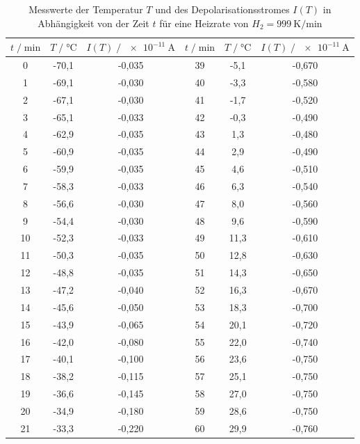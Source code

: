   \begin{table}
    \centering
    \caption{Messwerte der Temperatur $T$ und des Depolarisationsstromes $I(T)$ in Abhängigkeit von der Zeit $t$ für eine
    Heizrate von $H_2= \SI{999}{\kelvin\per\minute}$}
    \label{tab:mess2}
    \begin{tabular}{c c c c c c}
    \toprule
    $t \;/\; \si{\minute}$ & $T \;/\; \si{\celsius}$ & $I(T) \;/\; \SI{e-11}{\ampere}$ & 
    $t \;/\; \si{\minute}$ & $T \;/\; \si{\celsius}$ & $I(T) \;/\; \SI{e-11}{\ampere}$ \\
    \midrule
        0 & -70,1 & -0,035 & 39 & -5,1 & -0,670 \\
        1 & -69,1 & -0,030 & 40 & -3,3 & -0,580 \\
        2 & -67,1 & -0,030 & 41 & -1,7 & -0,520 \\
        3 & -65,1 & -0,033 & 42 & -0,3 & -0,490 \\
        4 & -62,9 & -0,035 & 43 &  1,3 & -0,480 \\
        5 & -60,9 & -0,035 & 44 &  2,9 & -0,490 \\
        6 & -59,9 & -0,035 & 45 &  4,6 & -0,510 \\
        7 & -58,3 & -0,033 & 46 &  6,3 & -0,540 \\
        8 & -56,6 & -0,030 & 47 &  8,0 & -0,560 \\
        9 & -54,4 & -0,030 & 48 &  9,6 & -0,590 \\
       10 & -52,3 & -0,033 & 49 & 11,3 & -0,610 \\
       11 & -50,3 & -0,035 & 50 & 12,8 & -0,630 \\
       12 & -48,8 & -0,035 & 51 & 14,3 & -0,650 \\
       13 & -47,2 & -0,040 & 52 & 16,3 & -0,670 \\
       14 & -45,6 & -0,050 & 53 & 18,3 & -0,700 \\
       15 & -43,9 & -0,065 & 54 & 20,1 & -0,720 \\
       16 & -42,0 & -0,080 & 55 & 22,0 & -0,740 \\
       17 & -40,1 & -0,100 & 56 & 23,6 & -0,750 \\
       18 & -38,2 & -0,115 & 57 & 25,1 & -0,750 \\
       19 & -36,6 & -0,145 & 58 & 27,0 & -0,750 \\
       20 & -34,9 & -0,180 & 59 & 28,6 & -0,750 \\
       21 & -33,3 & -0,220 & 60 & 29,9 & -0,760 \\

\end{tabular}
\end{table}
